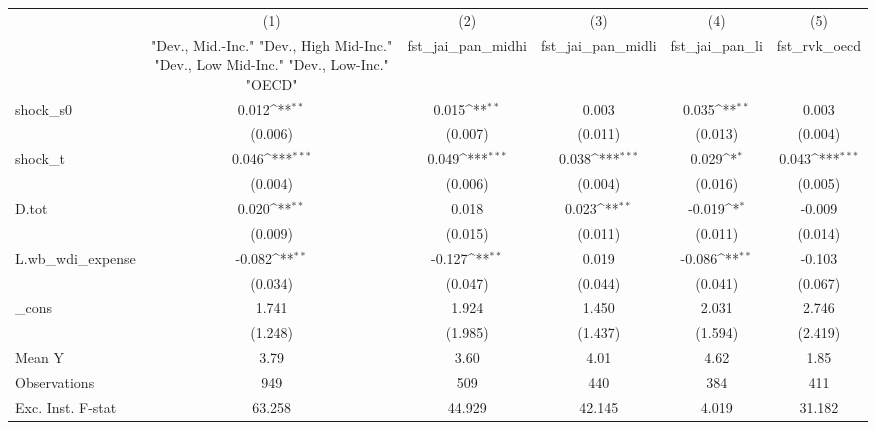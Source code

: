{
\def\sym#1{\ifmmode^{#1}\else\(^{#1}\)\fi}
\begin{tabular}{l*{5}{c}}
\toprule
            &\multicolumn{1}{c}{(1)}&\multicolumn{1}{c}{(2)}&\multicolumn{1}{c}{(3)}&\multicolumn{1}{c}{(4)}&\multicolumn{1}{c}{(5)}\\
            &\multicolumn{1}{c}{ "Dev., Mid.-Inc." "Dev., High Mid-Inc." "Dev., Low Mid-Inc." "Dev., Low-Inc." "OECD" }&\multicolumn{1}{c}{fst\_jai\_pan\_midhi}&\multicolumn{1}{c}{fst\_jai\_pan\_midli}&\multicolumn{1}{c}{fst\_jai\_pan\_li}&\multicolumn{1}{c}{fst\_rvk\_oecd}\\
\midrule
shock\_s0    &       0.012\sym{**} &       0.015\sym{**} &       0.003         &       0.035\sym{**} &       0.003         \\
            &     (0.006)         &     (0.007)         &     (0.011)         &     (0.013)         &     (0.004)         \\
\addlinespace
shock\_t     &       0.046\sym{***}&       0.049\sym{***}&       0.038\sym{***}&       0.029\sym{*}  &       0.043\sym{***}\\
            &     (0.004)         &     (0.006)         &     (0.004)         &     (0.016)         &     (0.005)         \\
\addlinespace
D.tot       &       0.020\sym{**} &       0.018         &       0.023\sym{**} &      -0.019\sym{*}  &      -0.009         \\
            &     (0.009)         &     (0.015)         &     (0.011)         &     (0.011)         &     (0.014)         \\
\addlinespace
L.wb\_wdi\_expense&      -0.082\sym{**} &      -0.127\sym{**} &       0.019         &      -0.086\sym{**} &      -0.103         \\
            &     (0.034)         &     (0.047)         &     (0.044)         &     (0.041)         &     (0.067)         \\
\addlinespace
\_cons      &       1.741         &       1.924         &       1.450         &       2.031         &       2.746         \\
            &     (1.248)         &     (1.985)         &     (1.437)         &     (1.594)         &     (2.419)         \\
\midrule
Mean Y      &        3.79         &        3.60         &        4.01         &        4.62         &        1.85         \\
Observations&         949         &         509         &         440         &         384         &         411         \\
Exc. Inst. F-stat&      63.258         &      44.929         &      42.145         &       4.019         &      31.182         \\
\bottomrule
\end{tabular}
}

